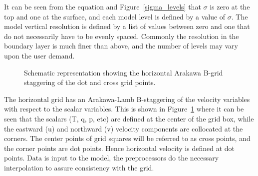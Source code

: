 It can be seen from the equation and Figure~\ref{sigma_levels} that $\sigma$ is
zero at the top and one at the surface, and each model level is defined by a
value of $\sigma$. The model vertical resolution is defined by a list of values
between zero and one that do not necessarily have to be evenly spaced. Commonly
the resolution in the boundary layer is much finer than above, and the number of
levels may vary upon the user demand.

\begin{figure} \begin{center} 
\caption{Schematic representation showing the horizontal Arakawa B-grid
staggering of the dot and cross grid points.}  \label{grid} \end{center}
\end{figure}

The horizontal grid has an Arakawa-Lamb B-staggering of the velocity variables
with respect to the scalar variables. This is shown in Figure~\ref{grid} where
it can be seen that the scalars (T, q, p, etc) are defined at the center of the
grid box, while the eastward (u) and northward (v) velocity components are
collocated at the corners. The center points of grid squares will be referred to
as cross points, and the corner points are dot points.  Hence horizontal
velocity is defined at dot points. Data is input to the model, the preprocessors
do the necessary interpolation to assure consistency with the grid.

